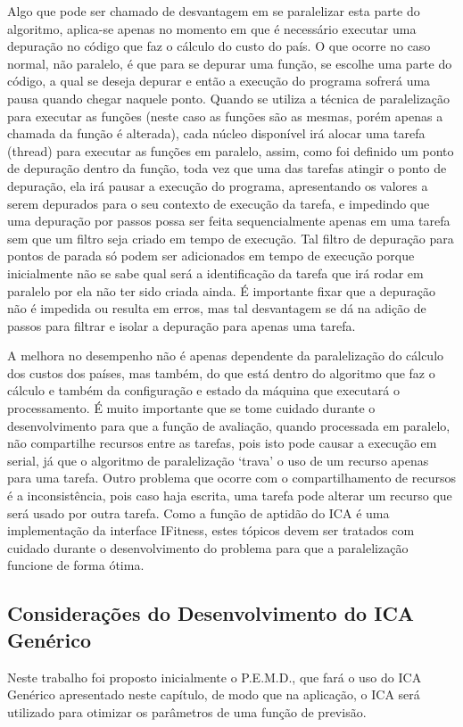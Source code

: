 Algo que pode ser chamado de desvantagem em se paralelizar esta parte do algoritmo, aplica-se apenas no momento em que é necessário executar uma depuração no código que faz o cálculo do custo do país. O que ocorre no caso normal, não paralelo, é que para se depurar uma função, se escolhe uma parte do código, a qual se deseja depurar e então a execução do programa sofrerá uma pausa quando chegar naquele ponto. Quando se utiliza a técnica de paralelização para executar as funções (neste caso as funções são as mesmas, porém apenas a chamada da função é alterada), cada núcleo disponível irá alocar uma tarefa (thread) para executar as funções em paralelo, assim, como foi definido um ponto de depuração dentro da função, toda vez que uma das tarefas atingir o ponto de depuração, ela irá pausar a execução do programa, apresentando os valores a serem depurados para o seu contexto de execução da tarefa, e impedindo que uma depuração por passos possa ser feita sequencialmente apenas em uma tarefa sem que um filtro seja criado em tempo de execução. Tal filtro de depuração para pontos de parada só podem ser adicionados em tempo de execução porque inicialmente não se sabe qual será a identificação da tarefa que irá rodar em paralelo por ela não ter sido criada ainda. É importante fixar que a depuração não é impedida ou resulta em erros, mas tal desvantagem se dá na adição de passos para filtrar e isolar a depuração para apenas uma tarefa.


A melhora no desempenho não é apenas dependente da paralelização do cálculo dos custos dos países, mas também, do que está dentro do algoritmo que faz o cálculo e também da configuração e estado da máquina que executará o processamento. É muito importante que se tome cuidado durante o desenvolvimento para que a função de avaliação, quando processada em paralelo, não compartilhe recursos entre as tarefas, pois isto pode causar a execução em serial, já que o algoritmo de paralelização ‘trava’ o uso de um recurso apenas para uma tarefa. Outro problema que ocorre com o compartilhamento de recursos é a inconsistência, pois caso haja escrita, uma tarefa pode alterar um recurso que será usado por outra tarefa. Como a função de aptidão do ICA é uma implementação da interface IFitness, estes tópicos devem ser tratados com cuidado durante o desenvolvimento do problema para que a paralelização funcione de forma ótima.


\subsection{Considerações do Desenvolvimento do ICA Genérico}
\label{Considerações do Desenvolvimento do ICA Genérico}
Neste trabalho foi proposto inicialmente o P.E.M.D., que fará o uso do ICA Genérico apresentado neste capítulo, de modo que na aplicação, o ICA será utilizado para otimizar os parâmetros de uma função de previsão.

